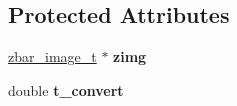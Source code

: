 \subsection*{Protected Attributes}
\begin{DoxyCompactItemize}
\item 
\hypertarget{interface_z_bar_image_ad65289ccb5643dcc5b865664e022f4b8}{
\hyperlink{zbar_8h_a70d23bf7c2ee5e60fa0f19d4f66dc1bb}{zbar\_\-image\_\-t} $\ast$ {\bfseries zimg}}
\label{interface_z_bar_image_ad65289ccb5643dcc5b865664e022f4b8}

\item 
\hypertarget{interface_z_bar_image_a98c7da6b95585a8f646798b63388cf9d}{
double {\bfseries t\_\-convert}}
\label{interface_z_bar_image_a98c7da6b95585a8f646798b63388cf9d}

\end{DoxyCompactItemize}

